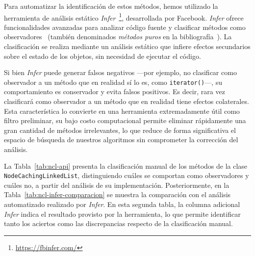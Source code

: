 Para automatizar la identificación de estos métodos, hemos utilizado la herramienta de análisis estático \emph{Infer}~\footnote{\url{https://fbinfer.com/}}, desarrollada por Facebook. 
\emph{Infer} ofrece funcionalidades avanzadas para analizar código fuente y clasificar métodos como observadores~\cite{Huang:2012} (también denominados \emph{métodos puros} en la bibliografía~\cite{Salcianu:2005}).
La clasificación se realiza mediante un análisis estático que infiere efectos secundarios sobre el estado de los objetos, sin necesidad de ejecutar el código.

Si bien \emph{Infer} puede generar falsos negativos —por ejemplo, no clasificar como observador a un método que en realidad sí lo es, como \texttt{iterator()}—, su comportamiento es conservador y evita falsos positivos. 
Es decir, rara vez clasificará como observador a un método que en realidad tiene efectos colaterales. 
Esta característica lo convierte en una herramienta extremadamente útil como filtro preliminar, su bajo costo computacional permite eliminar rápidamente una gran cantidad de métodos irrelevantes, 
lo que reduce de forma significativa el espacio de búsqueda de nuestros algoritmos sin comprometer la corrección del análisis.

La Tabla~\ref{tab:ncl-api} presenta la clasificación manual de los métodos de la clase 
\texttt{NodeCachingLinkedList}, distinguiendo cuáles se comportan como observadores y cuáles no, 
a partir del análisis de su implementación. 
Posteriormente, en la Tabla~\ref{tab:ncl-infer-comparacion} se muestra la comparación con el análisis 
automatizado realizado por \emph{Infer}. 
En esta segunda tabla, la columna adicional \emph{Infer} indica el resultado provisto por la herramienta, 
lo que permite identificar tanto los aciertos como las discrepancias respecto de la clasificación manual.

